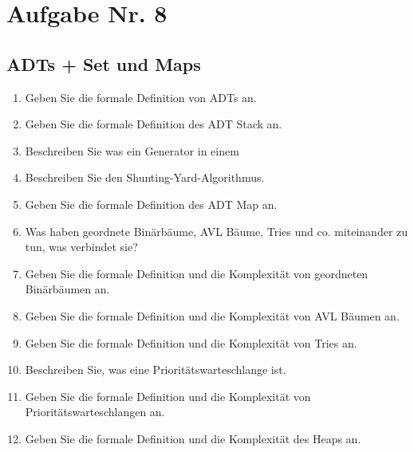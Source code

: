 \documentclass[12px,a4paper]{article}
\begin{document}
\section*{Aufgabe Nr. 8}
\subsection*{ADTs + Set und Maps}
\begin{enumerate}
	\item Geben Sie die formale Definition von ADTs an.
	\item Geben Sie die formale Definition des ADT Stack an.
	\item Beschreiben Sie was ein Generator in einem 
	\item Beschreiben Sie den Shunting-Yard-Algorithmus.
	\item Geben Sie die formale Definition des ADT Map an.
	\item Was haben geordnete Binärbäume, AVL Bäume, Tries und co. miteinander zu tun, was verbindet sie?
	\item Geben Sie die formale Definition und die Komplexität von geordneten Binärbäumen an.
	\item Geben Sie die formale Definition und die Komplexität von AVL Bäumen an.
	\item Geben Sie die formale Definition und die Komplexität von Tries an.
	\item Beschreiben Sie, was eine Prioritätswarteschlange ist. 
	\item Geben Sie die formale Definition und die Komplexität von Prioritätswarteschlangen an.
	\item Geben Sie die formale Definition und die Komplexität des Heaps an.
\end{enumerate}
\end{document}
